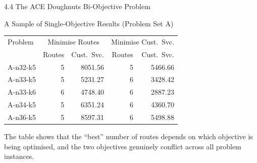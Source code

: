 \documentclass[aspectratio=169,10pt]{beamer}
\begin{document}
\begin{frame}[allowframebreaks]{4.4 The ACE Doughnuts Bi-Objective Problem}
  \begin{block}{A Sample of Single-Objective Results (Problem Set A)}
    \small
    \begin{tabular}{l rr | rr}
      \toprule
      Problem & \multicolumn{2}{c|}{Minimise Routes} & \multicolumn{2}{c}{Minimise Cust.\ Svc.} \\
              & Routes & Cust.\ Svc. & Routes & Cust.\ Svc. \\
      \midrule
      A-n32-k5 & 5 & 8051.56 & 5 & 5466.66 \\
      A-n33-k5 & 5 & 5231.27 & 6 & 3428.42 \\
      A-n33-k6 & 6 & 4748.40 & 6 & 2887.23 \\
      A-n34-k5 & 5 & 6351.24 & 6 & 4360.70 \\
      A-n36-k5 & 5 & 8597.31 & 6 & 5498.88 \\
      \bottomrule
    \end{tabular}
  \end{block}

  The table shows that the ``best'' number of routes depends on which objective is
  being optimised, and the two objectives genuinely conflict across all problem
  instances.

\end{frame}
\end{document}
